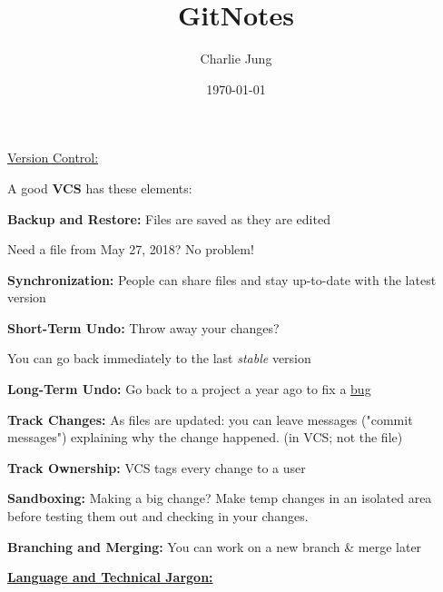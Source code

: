 \documentclass{article}
\title{GitNotes}
\author{Charlie Jung}
\date{\today}
\begin{document}
\maketitle
\newpage
\begin{flushleft}

\underline{Version Control:} \\
\par

A good \textbf{VCS} has these elements: \\
\par

\textbf{Backup and Restore:} Files are saved as they are edited \par
Need a file from May 27, 2018? No problem! \\
\par

\textbf{Synchronization:} People can share files and stay up-to-date with the latest version \\
\par

\textbf{Short-Term Undo:} Throw away your changes? \par
You can go back immediately to the last \textit{stable} version \\
\par

\textbf{Long-Term Undo:} Go back to a project a year ago to fix a \underline{bug} \\
\par

\textbf{Track Changes:} As files are updated: you can leave messages ("commit messages") explaining why the change happened. (in VCS; not the file) \\
\par

\textbf{Track Ownership:} VCS tags every change to a user \\
\par

\textbf{Sandboxing:} Making a big change? Make temp changes in an isolated area before testing them out and checking in your changes. \\
\par

\textbf{Branching and Merging:} You can work on a new branch & merge later \\
\par

\textbf{\underline{Language and Technical Jargon:}} \\
\par


\end{flushleft}
\end{document}
